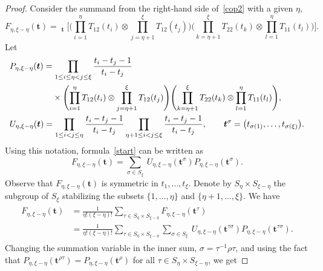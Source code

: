 \documentclass[10pt,a4paper]{amsart}
\numberwithin{equation}{section}
\DeclareMathOperator{\Symb}{\overline{Sym} }
\begin{document}
\begin{proof}
Consider the summand from the right-hand side of~\eqref{cop2} with a given $\eta$,
\begin{equation} \label{start}
F_{\eta,\xi-\eta}(\boldsymbol{t})= \Symb_{\boldsymbol{t}}\Biggl[ \Biggl(\prod_{i=1}^{\eta} T_{12} (t_i) \otimes \prod_{j=\eta+1}^{\xi } T_{12} (t_j) \Biggr)
\Biggl(\prod_{k=\eta+1}^{\xi } T _{22}(t_{k})\otimes \prod_{l=1}^{\eta} T _{11}(t_l)\Biggr) \Biggr].
\end{equation}
Let
\begin{align*}
&P_{\eta,\xi-\eta} (\boldsymbol{t})= \prod_{1\leq i\leq\eta<j \leq \xi} \frac{t_i-t_j-1}{t_i-t_j}\\
& \hphantom{P_{\eta,\xi-\eta} (\boldsymbol{t})=}{}\times{}\Biggl(\prod_{i=1}^{\eta} T_{12} (t_i) \otimes \prod_{j=\eta+1}^{\xi } T_{12} (t_j) \Biggr) \Biggl(\prod_{k=\eta+1}^{\xi } T _{22}(t_{k})\otimes \prod_{l=1}^{\eta} T _{11}(t_l)\Biggr),\\
& U_{\eta,\xi-\eta}(\boldsymbol{t})= \prod_{1\leq i<j\leq \eta} \frac{t_{i}-t_{j}-1}{t_{i}-t_{j}} \prod_{\eta+1\leq i<j\leq \xi} \frac{t_{i}-t_{j}-1}{t_{i}-t_{j}}, \qquad
 \boldsymbol{t}^\sigma=\bigl(t_{\sigma(1)},\dots,t_{\sigma(\xi)}\bigr).
\end{align*}
Using this notation, formula~\eqref{start} can be written as
\begin{equation*}%
F_{\eta,\xi-\eta}(\boldsymbol{t})=\sum_{\sigma\in S_\xi}\ U_{\eta,\xi-\eta}(\boldsymbol{t}^\sigma) P_{\eta,\xi-\eta}(\boldsymbol{t}^\sigma).
\end{equation*}
Observe that $ F_{\eta,\xi-\eta}(\boldsymbol{t})$ is symmetric in $t_1,\dots,t_\xi$.
Denote by $S_\eta \times S_{\xi-\eta} $ the subgroup of $S_\xi$ stabilizing the subsets $\{1,\dots,\eta\}$ and $\{\eta+1,\dots,\xi\}$. We have
\begin{align*}%
\begin{split}
F_{\eta,\xi-\eta}(\boldsymbol{t})&{}=\frac{1}{\eta!(\xi-\eta)!} \sum_{\tau\in S_\eta\times S_{\xi-\eta}} F_{\eta,\xi-\eta}(\boldsymbol{t}^\tau)\\
&{}=\frac{1}{\eta!(\xi-\eta)!} \sum_{\tau\in S_\eta\times S_{\xi-\eta}} \sum_{\sigma\in S_\xi}\ U_{\eta,\xi-\eta}(\boldsymbol{t}^{\tau\sigma}) P_{\eta,\xi-\eta}(\boldsymbol{t}^{\tau\sigma}).
\end{split}
\end{align*}
Changing the summation variable in the inner sum, $\sigma=\tau^{-1}\rho\tau$, and using the fact that $P_{\eta,\xi-\eta}(\boldsymbol{t}^{\rho\tau})=P_{\eta,\xi-\eta}(\boldsymbol{t}^{\rho})$ for all $\tau \in S_\eta\times S_{\xi-\eta}$, we get

\end{proof}
\end{document}
